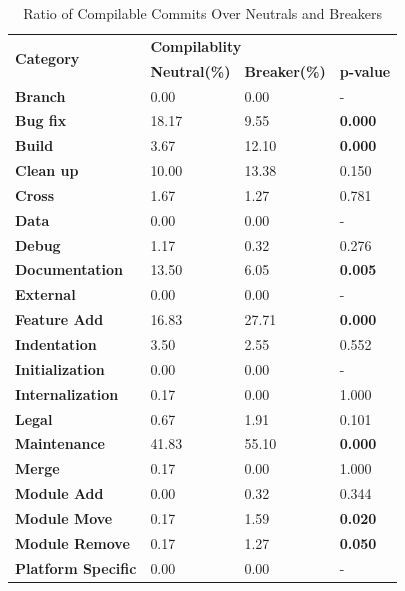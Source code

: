 \begin{table}[htbp]
    \centering
    \caption{Ratio of Compilable Commits Over Neutrals and Breakers}
      \begin{tabular}{llll}
      \hline
      \multirow{2}[4]{*}{\textbf{Category}} & \multicolumn{3}{l}{\textbf{Compilablity}} \\          & \textbf{Neutral(\%)} & \textbf{Breaker(\%)} & \textbf{p-value} \\
      \hline
      \textbf{Branch} & 0.00  & 0.00  & - \\
      \hline
      \textbf{Bug fix} & 18.17  & 9.55  & \textbf{0.000} \\
      \hline
      \textbf{Build} & 3.67  & 12.10  & \textbf{0.000} \\
      \hline
      \textbf{Clean up} & 10.00  & 13.38  & 0.150  \\
      \hline
      \textbf{Cross} & 1.67  & 1.27  & 0.781  \\
      \hline
      \textbf{Data} & 0.00  & 0.00  & - \\
      \hline
      \textbf{Debug} & 1.17  & 0.32  & 0.276  \\
      \hline
      \textbf{Documentation} & 13.50  & 6.05  & \textbf{0.005} \\
      \hline
      \textbf{External} & 0.00  & 0.00  & - \\
      \hline
      \textbf{Feature Add} & 16.83  & 27.71  & \textbf{0.000} \\
      \hline
      \textbf{Indentation} & 3.50  & 2.55  & 0.552  \\
      \hline
      \textbf{Initialization} & 0.00  & 0.00  & - \\
      \hline
      \textbf{Internalization} & 0.17  & 0.00  & 1.000  \\
      \hline
      \textbf{Legal} & 0.67  & 1.91  & 0.101  \\
      \hline
      \textbf{Maintenance} & 41.83  & 55.10  & \textbf{0.000} \\
      \hline
      \textbf{Merge} & 0.17  & 0.00  & 1.000  \\
      \hline
      \textbf{Module Add} & 0.00  & 0.32  & 0.344  \\
      \hline
      \textbf{Module Move} & 0.17  & 1.59  & \textbf{0.020} \\
      \hline
      \textbf{Module Remove} & 0.17  & 1.27  & \textbf{0.050} \\
      \hline
      \textbf{Platform Specific} & 0.00  & 0.00  & - \\

\end{tabular}
\end{table}
